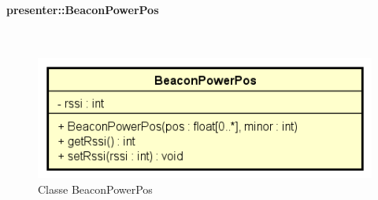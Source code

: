 \documentclass[../DefinizioneDiProdotto.tex]{subfiles}
\begin{document}
\paragraph{presenter::BeaconPowerPos}
\
\begin{figure}[H]
	\centering
	\includegraphics[width=\maxwidth]{img/BeaconPowerPos.png}
	\caption{Classe BeaconPowerPos}\label{fig:presenter::BeaconPowerPos} 
\end{figure}
\end{document}
